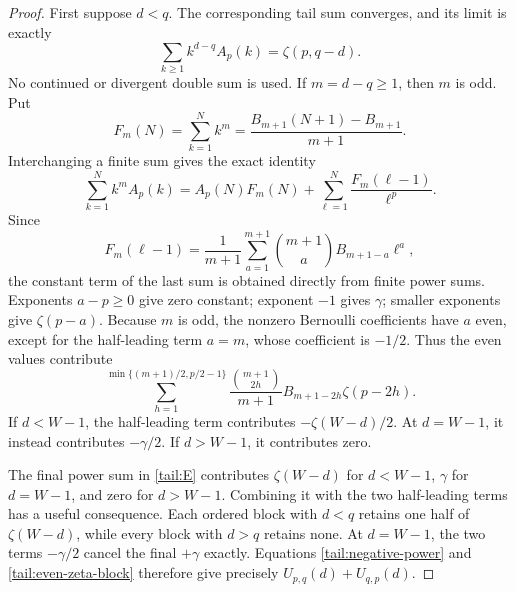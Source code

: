 \begin{proof}
First suppose \(d<q\). The corresponding tail sum converges, and
its limit is exactly
\begin{equation}\label{tail:negative-power}
 \sum_{k\ge1}k^{d-q}A_p(k)=\zeta(p,q-d).
\end{equation}
No continued or divergent double sum is used. If \(m=d-q\ge1\),
then \(m\) is odd. Put
\[
 F_m(N)=\sum_{k=1}^{N}k^m
       =\frac{B_{m+1}(N+1)-B_{m+1}}{m+1}.
\]
Interchanging a finite sum gives the exact identity
\begin{equation}\label{tail:Faulhaber-change}
 \sum_{k=1}^{N}k^mA_p(k)
 =A_p(N)F_m(N)
   +\sum_{\ell=1}^{N}\frac{F_m(\ell-1)}{\ell^p}.
\end{equation}
Since
\[
 F_m(\ell-1)=\frac1{m+1}
    \sum_{a=1}^{m+1}\binom{m+1}{a}B_{m+1-a}\ell^a,
\]
the constant term of the last sum is obtained directly from finite
power sums. Exponents \(a-p\ge0\) give zero constant; exponent
\(-1\) gives \(\gamma\); smaller exponents give \(\zeta(p-a)\).
Because \(m\) is odd, the nonzero Bernoulli coefficients have
\(a\) even, except for the half-leading term \(a=m\), whose
coefficient is \(-1/2\). Thus the even values contribute
\begin{equation}\label{tail:even-zeta-block}
 \sum_{h=1}^{\min\{(m+1)/2,p/2-1\}}
 \frac{\binom{m+1}{2h}}{m+1}B_{m+1-2h}\zeta(p-2h).
\end{equation}
If \(d<W-1\), the half-leading term contributes
\(-\zeta(W-d)/2\). At \(d=W-1\), it instead contributes
\(-\gamma/2\). If \(d>W-1\), it contributes zero.

The final power sum in \eqref{tail:E} contributes
\(\zeta(W-d)\) for \(d<W-1\), \(\gamma\) for \(d=W-1\), and
zero for \(d>W-1\). Combining it with the two half-leading terms
has a useful consequence. Each ordered block with \(d<q\) retains
one half of \(\zeta(W-d)\), while every block with \(d>q\)
retains none. At \(d=W-1\), the two terms \(-\gamma/2\) cancel
the final \(+\gamma\) exactly. Equations
\eqref{tail:negative-power} and \eqref{tail:even-zeta-block}
therefore give precisely \(U_{p,q}(d)+U_{q,p}(d)\).


\end{proof}
